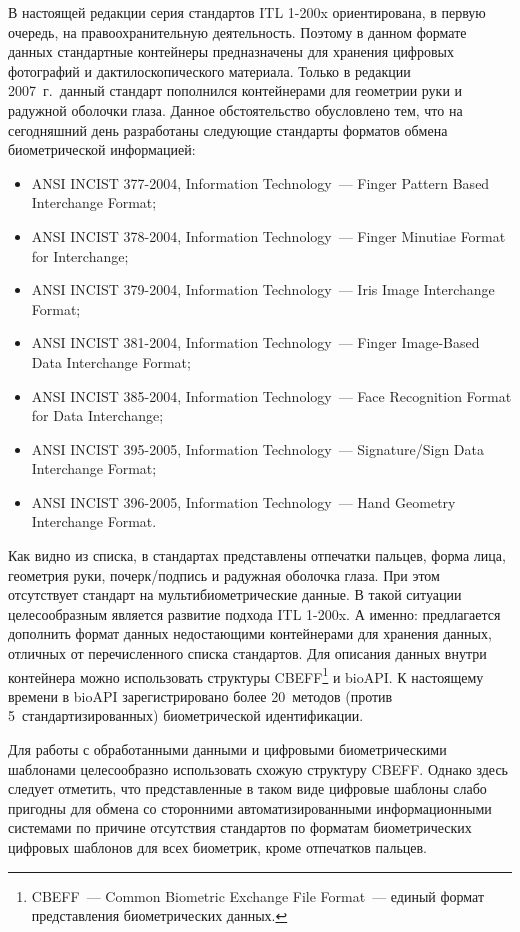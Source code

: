 \begin{multicols}{2}
  В настоящей редакции серия стандартов ITL 1-200x ориентирована, в первую 
очередь, на правоохранительную деятельность. Поэтому в данном формате 
данных стандартные контейнеры предназначены для хранения цифровых 
фотографий и дактилоскопического материала. Только в редакции 2007~г.\ 
данный стандарт пополнился контейнерами для геометрии руки и радужной 
оболочки глаза. Данное обстоятельство обусловлено тем, что на сегодняшний 
день разработаны следующие стандарты форматов обмена биометрической 
ин\-фор\-ма\-цией:
  \begin{itemize}
\item ANSI INCIST 377-2004, Information Technology~--- Finger Pattern 
Based Interchange Format;
\item ANSI INCIST 378-2004, Information Technology~--- Finger 
Minutiae Format for Interchange;
\item ANSI INCIST 379-2004, Information Technology~--- Iris Image 
Interchange Format;
\item ANSI INCIST 381-2004, Information Technology~--- Finger 
Image-Based Data Interchange Format;
\item ANSI INCIST 385-2004, Information Technology~--- Face 
Recognition Format for Data Interchange;
\item ANSI INCIST 395-2005, Information Technology~--- 
Signature/Sign Data Interchange Format;
\item ANSI INCIST 396-2005, Information Technology~--- Hand 
Geometry Interchange Format.
  \end{itemize}
  
 
  Как видно из списка, в стандартах представлены отпечатки пальцев, форма 
лица, геометрия руки, почерк/подпись и радужная оболочка глаза. При этом 
отсутствует стандарт на мультибиометрические данные. В такой ситуации 
целесообразным является развитие подхода ITL 1-200x. А именно: предлагается 
дополнить формат данных недостающими контейнерами для хранения данных, 
отличных от перечисленного списка стандартов. Для описания данных внутри 
контейнера можно использовать структуры CBEFF\footnote{CBEFF~--- Common Biometric Exchange File Format~---
единый формат представления биометрических данных.} 
и bioAPI. К настоящему 
времени в bioAPI зарегистрировано более 20~методов (против 
5~стандартизированных) биометрической идентификации. 


  Для работы с обработанными данными и цифровыми биометрическими 
шаблонами целесообразно использовать схожую структуру CBEFF. Однако 
здесь следует отметить, что представленные в таком виде цифровые шаблоны 
слабо пригодны для обмена со сторонними автоматизированными информационными системами по причине отсутствия 
стандартов по форматам биометрических цифровых шаблонов для всех 
биометрик, кроме отпечатков пальцев.


\end{multicols}
